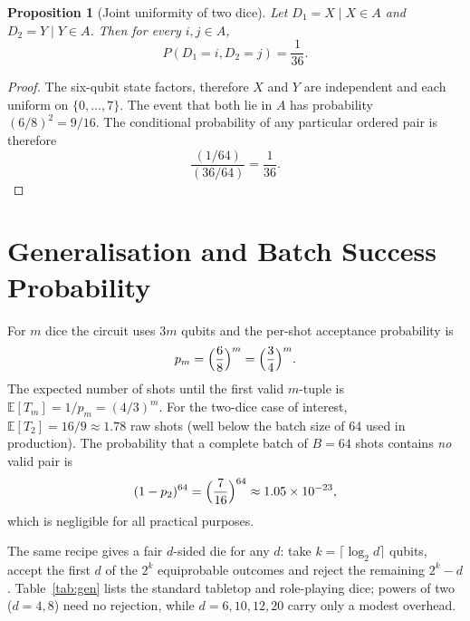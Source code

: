 \documentclass[journal]{IEEEtran}
\newtheorem{proposition}{Proposition}
\begin{document}
\begin{proposition}[Joint uniformity of two dice]\label{prop:joint}
Let $D_1=X\mid X\in A$ and $D_2=Y\mid Y\in A$. Then for every $i,j\in A$,
\begin{equation}
P(D_1=i,D_2=j)=\frac{1}{36}.
\end{equation}
\end{proposition}

\begin{proof}
The six-qubit state factors, therefore $X$ and $Y$ are independent and each uniform on $\{0,\dots,7\}$. The event that both lie in $A$ has probability $(6/8)^2=9/16$. The conditional probability of any particular ordered pair is therefore
\begin{equation}
\frac{(1/64)}{(36/64)}=\frac{1}{36}.
\end{equation}
\end{proof}

\section{Generalisation and Batch Success Probability}

For $m$ dice the circuit uses $3m$ qubits and the per-shot acceptance probability is
\begin{equation}
p_m = \Bigl(\frac{6}{8}\Bigr)^m = \Bigl(\frac{3}{4}\Bigr)^m.
\end{equation}
The expected number of shots until the first valid $m$-tuple is $\mathbb{E}[T_m]=1/p_m=(4/3)^m$. For the two-dice case of interest, $\mathbb{E}[T_2]=16/9\approx 1.78$ raw shots (well below the batch size of 64 used in production). The probability that a complete batch of $B=64$ shots contains \emph{no} valid pair is
\begin{equation}
(1-p_2)^{64}=\Bigl(\frac{7}{16}\Bigr)^{64}\approx 1.05\times 10^{-23},
\end{equation}
which is negligible for all practical purposes.

The same recipe gives a fair $d$-sided die for any $d$: take $k=\lceil\log_2 d\rceil$ qubits, accept the first $d$ of the $2^k$ equiprobable outcomes and reject the remaining $2^k-d$. Table~\ref{tab:gen} lists the standard tabletop and role-playing dice; powers of two ($d=4,8$) need no rejection, while $d=6,10,12,20$ carry only a modest overhead.
\end{document}
